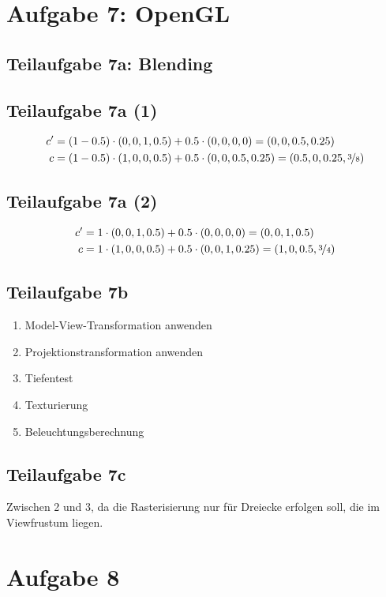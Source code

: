 \documentclass[a4paper]{scrartcl}
\begin{document}
\section*{Aufgabe 7: OpenGL}
\subsection*{Teilaufgabe 7a: Blending}
\subsection*{Teilaufgabe 7a (1)}
\begin{align}
    c' &= (1 - 0.5) \cdot (0,0,1,0.5) + 0.5 \cdot (0,0,0,0) = (0,0,0.5,0.25)\\
    c  &= (1 - 0.5) \cdot (1,0,0,0.5) + 0.5 \cdot (0,0,0.5,0.25) = (0.5,0,0.25, \nicefrac{3}{8})
\end{align}

\subsection*{Teilaufgabe 7a (2)}
\begin{align}
    c' &= 1 \cdot (0,0,1,0.5) + 0.5 \cdot (0,0,0,0) = (0,0,1,0.5)\\
    c  &= 1 \cdot (1,0,0,0.5) + 0.5 \cdot (0,0,1,0.25) = (1,0,0.5, \nicefrac{3}{4})
\end{align}

\subsection*{Teilaufgabe 7b}
\begin{enumerate}
    \item Model-View-Transformation anwenden
    \item Projektionstransformation anwenden
    \item Tiefentest
    \item Texturierung
    \item Beleuchtungsberechnung
\end{enumerate}

\subsection*{Teilaufgabe 7c}
Zwischen 2 und 3, da die Rasterisierung nur für Dreiecke erfolgen soll, die
im Viewfrustum liegen.

\section*{Aufgabe 8}
\end{document}
